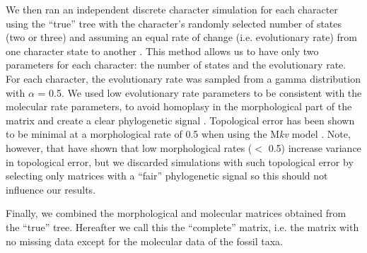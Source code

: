 We then ran an independent discrete character simulation for each character using the ``true'' tree with the character's randomly selected number of states (two or three) and assuming an equal rate of change (i.e. evolutionary rate) from one character state to another \citep{Pagel22011994}.
This method allows us to have only two parameters for each character: the number of states and the evolutionary rate.
For each character, the evolutionary rate was sampled from a gamma distribution with $\alpha$ = 0.5.
We used low evolutionary rate parameters to be consistent with the molecular rate parameters, to avoid homoplasy in the morphological part of the matrix and create a clear phylogenetic signal \citep{wrightbayesian2014}.
Topological error has been shown to be minimal at a morphological rate of 0.5 when using the M\textit{kv} model \citep{lewisa2001,wrightbayesian2014}.
Note, however, that \cite{wrightbayesian2014} have shown that low morphological rates ($<$ 0.5) increase variance in topological error, but we discarded simulations with such topological error by selecting only matrices with a ``fair'' phylogenetic signal \citep[see Estimating phylogenies section below;][]{zanderminimal2004} so this should not influence our results.

Finally, we combined the morphological and molecular matrices obtained from the ``true'' tree.
Hereafter we call this the ``complete'' matrix, i.e. the matrix with no missing data except for the molecular data of the fossil taxa.


